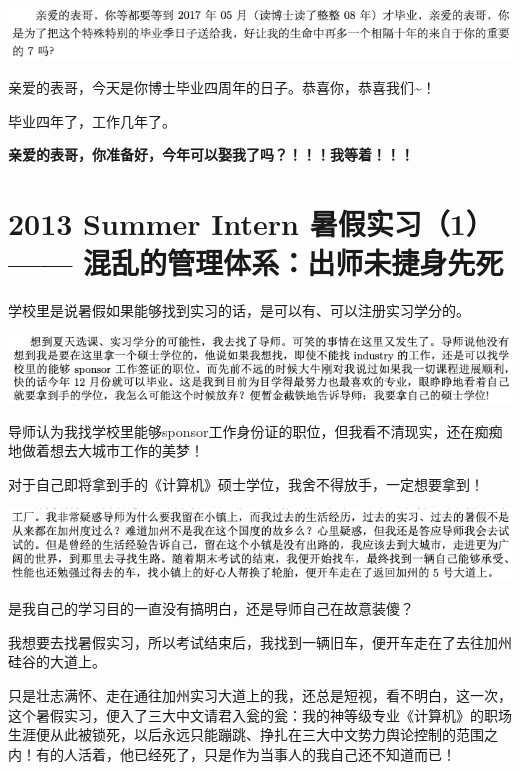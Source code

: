 \documentclass[9pt, b5paper]{article}
\begin{document}
\begin{center}
\includegraphics[width=.9\linewidth]{./pic/backups_plans_20210506_205646.png}
\end{center}

亲爱的表哥，今天是你博士毕业四周年的日子。恭喜你，恭喜我们\textasciitilde{}！

毕业四年了，工作几年了。

\textbf{亲爱的表哥，你准备好，今年可以娶我了吗？！！！我等着！！！}

\section{2013 Summer Intern 暑假实习（1） —— 混乱的管理体系：出师未捷身先死}
\label{sec:org5974bbc}

学校里是说暑假如果能够找到实习的话，是可以有、可以注册实习学分的。 

\begin{center}
\includegraphics[width=.9\linewidth]{./pic/backups_plans_20210424_220153.png}
\end{center}

导师认为我找学校里能够sponsor工作身份证的职位，但我看不清现实，还在痴痴地做着想去大城市工作的美梦！

对于自己即将拿到手的《计算机》硕士学位，我舍不得放手，一定想要拿到！

\begin{center}
\includegraphics[width=.9\linewidth]{./pic/backups_plans_20210424_220214.png}
\end{center}

是我自己的学习目的一直没有搞明白，还是导师自己在故意装傻？

我想要去找暑假实习，所以考试结束后，我找到一辆旧车，便开车走在了去往加州硅谷的大道上。 

只是壮志满怀、走在通往加州实习大道上的我，还总是短视，看不明白，这一次，这个暑假实习，便入了三大中文请君入瓮的瓮：我的神等级专业《计算机》的职场生涯便从此被锁死，以后永远只能蹦跳、挣扎在三大中文势力舆论控制的范围之内！有的人活着，他已经死了，只是作为当事人的我自己还不知道而已！
\end{document}
